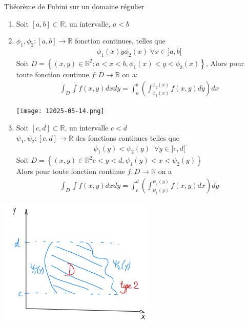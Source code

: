 \begin{parag}{Théorème de Fubini sur un domaine régulier}
   \begin{theoreme}
    \begin{enumerate}
        \item Soit $\left[a, b\right] \subset \mathbb{R}$, un intervalle, $a < b$
        \item $\phi_1, \phi_2: \left[a, b\right] \to \mathbb{R}$ fonction continues, telles que
            \begin{align*} \phi_1\left(x\right) y \phi_2\left(x\right) \; \forall x \in ] a, b [ \end{align*}
            Soit $D =  \left\{\left(x, y\right) \in \mathbb{R}^{2}: a < x < b, \phi_1\left(x\right) < y < \phi_2\left(x\right)\right\}$, Alors pour toute fonction continue $f: \overline{D} \to \mathbb{R}$ on a:
            \begin{align*} 
                \int_D \int f\left(x, y\right)dxdy = \int_a^b\left(\int_{\phi_1\left(x\right)}^{\phi_2\left(x\right)}f\left(x, y\right) dy\right)dx
            \end{align*}
            \begin{center}
                \texttt{[image: 12025-05-14.png]}
            \end{center}
            
        \item Soit $\left[c, d\right] \subset \mathbb{R}$, un intervalle $c < d$\\
            $\psi_1, \psi_2 : \left[c, d\right] \to \mathbb{R}$ des fonctions continues telles que
            \begin{align*} \psi_1\left(y\right) < \psi_2\left(y\right)\; \; \forall y \in ] c, d [ \end{align*}
            Soit $D =  \left\{\left(x, y\right) \in \mathbb{R}^{2}c < y < d, \psi_1\left(y\right) < x < \psi_2\left(y\right)\right\}$ \\
            Alors pour toute fonction continue $f: D \to \mathbb{R}$ on a
            \begin{align*} \int_D \int f\left(x, y\right)dxdy = \int_c^d\left(\int_{\psi_1\left(y\right)}^{\psi_2\left(y\right)} f\left(x, y\right)dx\right)dy \end{align*}
    \end{enumerate}
    \begin{center}
        \includegraphics[scale=1.1]{22025-05-14.png}
    \end{center}
   \end{theoreme} 
\end{parag}

